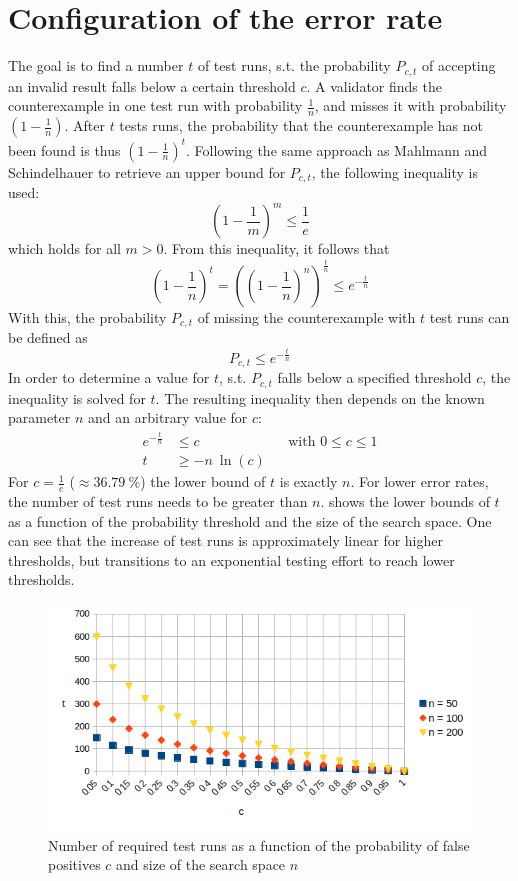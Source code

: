 \section{Configuration of the error rate}\label{sec:prob_threshold}
The goal is to find a number $t$ of test runs, s.t. the probability $P_{c,t}$ of accepting an invalid result falls below a certain threshold $c$. A validator finds the counterexample in one test run with probability $\frac{1}{n}$, and misses it with probability $(1-\frac{1}{n})$. After $t$ tests runs, the probability that the counterexample has not been found is thus $(1-\frac{1}{n})^t$. Following the same approach as Mahlmann and Schindelhauer \cite{mahl_schindel_2007} to retrieve an upper bound for $P_{c,t}$, the following inequality is used:
\begin{equation}
(1-\frac{1}{m})^m \leq \frac{1}{e}
\end{equation}
which holds for all $m > 0$. From this inequality, it follows that
\begin{equation}
(1-\frac{1}{n})^t = ((1-\frac{1}{n})^n)^{\frac{t}{n}} \le e^{-\frac{t}{n}}
\end{equation}
With this, the probability $P_{c,t}$ of missing the counterexample with $t$ test runs can be defined as
\begin{equation}
P_{c,t} \le e^{-\frac{t}{n}}
\end{equation}
In order to determine a value for $t$, s.t. $P_{c,t}$ falls below a specified threshold $c$, the inequality is solved for $t$. The resulting inequality then depends on the known parameter $n$ and an arbitrary value for $c$:
\begin{align}
    e^{-\frac{t}{n}} &\leq c && \text{with } 0 \leq c\le 1 \nonumber\\
    t &\geq -n\:\ln(c)
\end{align}
For $c = \frac{1}{e}$ ($\approx 36.79\:\%$) the lower bound of $t$ is exactly $n$. For lower error rates, the number of test runs needs to be greater than $n$.  shows the lower bounds of $t$ as a function of the probability threshold and the size of the search space. One can see that the increase of test runs is approximately linear for higher thresholds, but transitions to an exponential testing effort to reach lower thresholds.
\begin{figure}[h]
\includegraphics[width=0.95\linewidth]{figures/4-probabilistic_model/graph_t_c}
\caption{Number of required test runs as a function of the probability of false positives $c$ and size of the search space $n$}
\label{fig:graph_t_c}
\end{figure}

